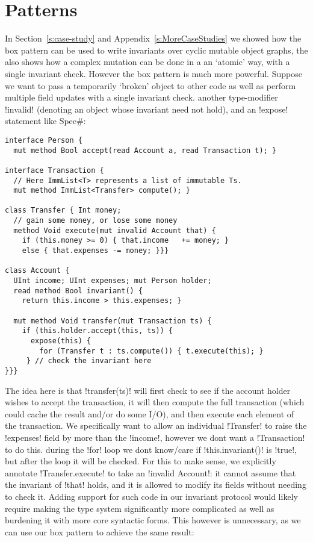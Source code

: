 \section{Patterns}
\label{s:patterns}
In Section~\ref{s:case-study} and Appendix~\ref{s:MoreCaseStudies} we showed how the box pattern can be used to write invariants over cyclic mutable object graphs, the  also shows how a complex mutation can be done in a an `atomic' way, with a single invariant check. However the box pattern is much more powerful. Suppose we want to pass a temporarily `broken' object to other code as well as perform multiple field updates with a single invariant check. 
 another type-modifier \Q!invalid! (denoting an object whose invariant need not hold), and an \Q!expose! statement like Spec\#:
\begin{lstlisting}
interface Person {
  mut method Bool accept(read Account a, read Transaction t); }

interface Transaction { 
  // Here ImmList<T> represents a list of immutable Ts.
  mut method ImmList<Transfer> compute(); }

class Transfer { Int money;
  // gain some money, or lose some money
  method Void execute(mut invalid Account that) {
    if (this.money >= 0) { that.income   += money; }
    else { that.expenses -= money; }}}

class Account {
  UInt income; UInt expenses; mut Person holder;
  read method Bool invariant() {
    return this.income > this.expenses; }
    
  mut method Void transfer(mut Transaction ts) {
    if (this.holder.accept(this, ts)) {
      expose(this) {
        for (Transfer t : ts.compute()) { t.execute(this); }
     } // check the invariant here
}}}
\end{lstlisting}
The idea here is that \Q!transfer(ts)! will first check to see if the account holder wishes to accept the transaction, it will then compute the full transaction (which could cache the result and/or do some I/O), and then execute each element of the transaction. We specifically want to allow an individual \Q!Transfer! to raise the \Q!expenses! field by more than the \Q!income!, however we dont want a \Q!Transaction! to do this. 
 during the \Q!for! loop we dont know/care if \Q!this.invariant()! is \Q!true!, but after the loop it will be checked. For this to make sense, we explicitly annotate \Q!Transfer.execute! to take an \Q!invalid Account!: it cannot assume that the invariant of \Q!that! holds, and it is allowed to modify its fields without needing to check it. Adding support for such code in our invariant protocol would likely require making the type system significantly more complicated as well as burdening it with more core syntactic forms. This however is unnecessary, as we can use our box pattern to achieve the same result:
